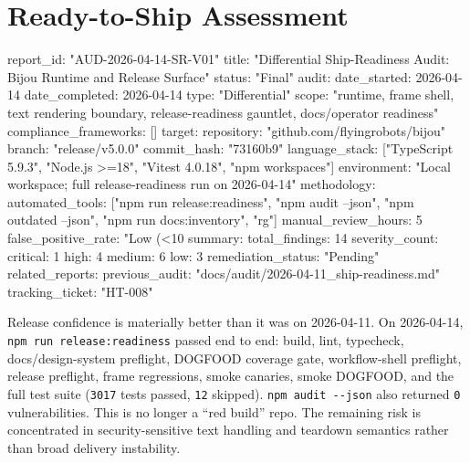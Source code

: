 \chapter{Ready-to-Ship Assessment}\label{record-418}

\smallskip

\begin{RecordMeta}
report_id: "AUD-2026-04-14-SR-V01"
title: "Differential Ship-Readiness Audit: Bijou Runtime and Release Surface"
status: "Final"
audit:
  date_started: 2026-04-14
  date_completed: 2026-04-14
  type: "Differential"
  scope: "runtime, frame shell, text rendering boundary, release-readiness gauntlet, docs/operator readiness"
  compliance_frameworks: []
target:
  repository: "github.com/flyingrobots/bijou"
  branch: "release/v5.0.0"
  commit_hash: "73160b9"
  language_stack: ["TypeScript 5.9.3", "Node.js >=18", "Vitest 4.0.18", "npm workspaces"]
  environment: "Local workspace; full release-readiness run on 2026-04-14"
methodology:
  automated_tools: ["npm run release:readiness", "npm audit --json", "npm outdated --json", "npm run docs:inventory", "rg"]
  manual_review_hours: 5
  false_positive_rate: "Low (<10%
summary:
  total_findings: 14
  severity_count:
    critical: 1
    high: 4
    medium: 6
    low: 3
  remediation_status: "Pending"
related_reports:
  previous_audit: "docs/audit/2026-04-11_ship-readiness.md"
  tracking_ticket: "HT-008"

\end{RecordMeta}

Release confidence is materially better than it was on 2026-04-11. On 2026-04-14, \texttt{n\allowbreak{}p\allowbreak{}m\allowbreak{} \allowbreak{}r\allowbreak{}u\allowbreak{}n\allowbreak{} \allowbreak{}r\allowbreak{}e\allowbreak{}l\allowbreak{}e\allowbreak{}a\allowbreak{}s\allowbreak{}e\allowbreak{}:\allowbreak{}r\allowbreak{}e\allowbreak{}a\allowbreak{}d\allowbreak{}i\allowbreak{}n\allowbreak{}e\allowbreak{}s\allowbreak{}s} passed end to end: build, lint, typecheck, docs/design-system preflight, DOGFOOD coverage gate, workflow-shell preflight, release preflight, frame regressions, smoke canaries, smoke DOGFOOD, and the full test suite (\texttt{3\allowbreak{}0\allowbreak{}1\allowbreak{}7} tests passed, \texttt{1\allowbreak{}2} skipped). \texttt{n\allowbreak{}p\allowbreak{}m\allowbreak{} \allowbreak{}a\allowbreak{}u\allowbreak{}d\allowbreak{}i\allowbreak{}t\allowbreak{} \allowbreak{}-\allowbreak{}-\allowbreak{}j\allowbreak{}s\allowbreak{}o\allowbreak{}n} also returned \texttt{0} vulnerabilities. This is no longer a ``red build'' repo. The remaining risk is concentrated in security-sensitive text handling and teardown semantics rather than broad delivery instability.

